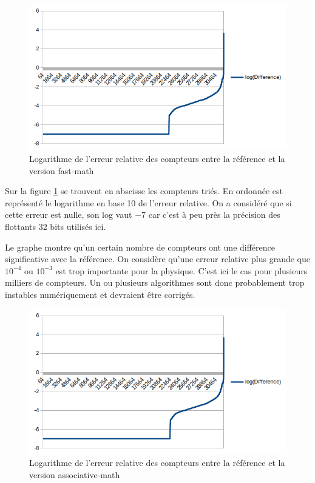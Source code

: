 \documentclass[a4paper,11pt]{report}
\begin{document}
\begin{figure}[H]
    \includegraphics[width=\textwidth, center]{fast-math_difference.png}
    \caption{Logarithme de l'erreur relative des compteurs entre la référence et la version fast-math}
    \label{fast-math_difference}
\end{figure}

Sur la figure \ref{fast-math_difference} se trouvent en abscisse les compteurs triés.
En ordonnée est représenté le logarithme en base 10 de l'erreur relative.
On a considéré que si cette erreur est nulle, son log vaut $-7$ car c'est à peu près la précision des flottants 32 bits utilisés ici.

Le graphe montre qu'un certain nombre de compteurs ont une différence significative avec la référence.
On considère qu'une erreur relative plus grande que $10^{-4}$ ou $10^{-3}$ est trop importante pour la physique.
C'est ici le cas pour plusieurs milliers de compteurs.
Un ou plusieurs algorithmes sont donc probablement trop instables numériquement et devraient être corrigés.

\begin{figure}[H]
    \includegraphics[width=\textwidth, center]{associative-math_difference.png}
    \caption{Logarithme de l'erreur relative des compteurs entre la référence et la version associative-math}
    \label{associative-math_difference}
\end{figure}
\end{document}
